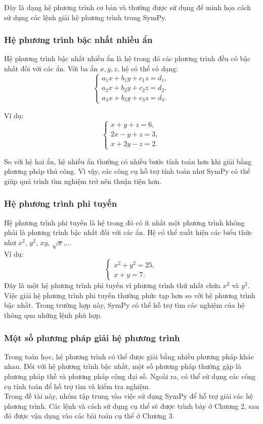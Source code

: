 \documentclass[13pt,a4paper]{article}
\begin{document}
\noindent Đây là dạng hệ phương trình cơ bản và thường được sử dụng để minh họa cách sử dụng các lệnh giải hệ phương trình trong SymPy.
\subsubsection{Hệ phương trình bậc nhất nhiều ẩn}
Hệ phương trình bậc nhất nhiều ẩn là hệ trong đó các phương trình đều có bậc nhất đối với các ẩn. Với ba ẩn $x, y, z$, hệ có thể có dạng:
\[
\begin{cases}
    a_1x + b_1y + c_1z = d_1, \\
    a_2x + b_2y + c_2z = d_2, \\
    a_3x + b_3y + c_3z = d_3.
\end{cases}
\]

\noindent Ví dụ:
\[
\begin{cases}
    x + y + z = 6, \\
    2x - y + z = 3, \\
    x + 2y - z = 2.
\end{cases}
\]

\noindent So với hệ hai ẩn, hệ nhiều ẩn thường có nhiều bước tính toán hơn khi giải bằng phương pháp thủ công. Vì vậy, các công cụ hỗ trợ tính toán như SymPy có thể giúp quá trình tìm nghiệm trở nên thuận tiện hơn.
\subsubsection{Hệ phương trình phi tuyến}
Hệ phương trình phi tuyến là hệ trong đó có ít nhất một phương trình không phải là phương trình bậc nhất đối với các ẩn. Hệ có thể xuất hiện các biểu thức như $x^2$, $y^2$, $xy$, $\sqrt{x}$,...\\
\noindent Ví dụ:
\[
\begin{cases}
    x^2 + y^2 = 25, \\
    x + y = 7.
\end{cases}
\]
\noindent Đây là một hệ phương trình phi tuyến vì phương trình thứ nhất chứa $x^2$ và $y^2$.\\
\noindent Việc giải hệ phương trình phi tuyến thường phức tạp hơn so với hệ phương trình bậc nhất. Trong trường hợp này, SymPy có thể hỗ trợ tìm các nghiệm của hệ thông qua những lệnh phù hợp.
\subsubsection{Một số phương pháp giải hệ phương trình}
Trong toán học, hệ phương trình có thể được giải bằng nhiều phương pháp khác nhau. Đối với hệ phương trình bậc nhất, một số phương pháp thường gặp là phương pháp thế và phương pháp cộng đại số. Ngoài ra, có thể sử dụng các công cụ tính toán để hỗ trợ tìm và kiểm tra nghiệm.\\
\noindent Trong đề tài này, nhóm tập trung vào việc sử dụng SymPy để hỗ trợ giải các hệ phương trình. Các lệnh và cách sử dụng cụ thể sẽ được trình bày ở Chương 2, sau đó được vận dụng vào các bài toán cụ thể ở Chương 3.
\end{document}
